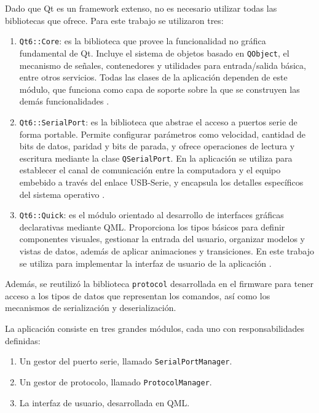 Dado que Qt es un framework extenso, no es necesario utilizar todas las bibliotecas que ofrece. Para este trabajo se utilizaron tres:
\begin{enumerate}
	\item \texttt{Qt6::Core}: es la biblioteca que provee la funcionalidad no gráfica fundamental de Qt. Incluye el sistema de objetos basado en \texttt{QObject}, el mecanismo de señales, contenedores y utilidades para entrada/salida básica, entre otros servicios. Todas las clases de la aplicación dependen de este módulo, que funciona como capa de soporte sobre la que se construyen las demás funcionalidades \cite{qt:core}.

	\item \texttt{Qt6::SerialPort}: es la biblioteca que abstrae el acceso a puertos serie de forma portable. Permite configurar parámetros como velocidad, cantidad de bits de datos, paridad y bits de parada, y ofrece operaciones de lectura y escritura mediante la clase \texttt{QSerialPort}. En la aplicación se utiliza para establecer el canal de comunicación entre la computadora y el equipo embebido a través del enlace USB-Serie, y encapsula los detalles específicos del sistema operativo \cite{qt:serialport}.

	\item \texttt{Qt6::Quick}: es el módulo orientado al desarrollo de interfaces gráficas declarativas mediante QML. Proporciona los tipos básicos para definir componentes visuales, gestionar la entrada del usuario, organizar modelos y vistas de datos, además de aplicar animaciones y transiciones. En este trabajo se utiliza para implementar la interfaz de usuario de la aplicación \cite{qt:quick}.
\end{enumerate}

Además, se reutilizó la biblioteca \texttt{protocol} desarrollada en el firmware para tener acceso a los tipos de datos que representan los comandos, así como los mecanismos de serialización y deserialización.

La aplicación consiste en tres grandes módulos, cada uno con responsabilidades definidas:
\begin{enumerate}
	\item Un gestor del puerto serie, llamado \texttt{SerialPortManager}.
	\item Un gestor de protocolo, llamado \texttt{ProtocolManager}.
	\item La interfaz de usuario, desarrollada en QML.
\end{enumerate}

